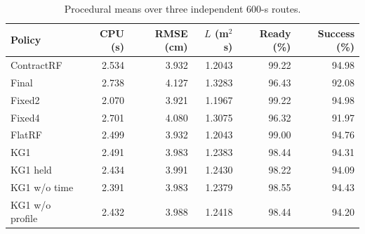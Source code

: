 \begin{table}[!htbp]\centering\footnotesize
\caption{Procedural means over three independent 600-s routes.}\label{supp:routeProceduralAirframe}
\begin{tabular}{@{}lrrrrr@{}}\toprule
Policy & CPU (s) & RMSE (cm) & $L$ (m$^2$s) & Ready (\%) & Success (\%)\\\midrule
ContractRF & 2.534 & 3.932 & 1.2043 & 99.22 & 94.98\\
Final & 2.738 & 4.127 & 1.3283 & 96.43 & 92.08\\
Fixed2 & 2.070 & 3.921 & 1.1967 & 99.22 & 94.98\\
Fixed4 & 2.701 & 4.080 & 1.3075 & 96.32 & 91.97\\
FlatRF & 2.499 & 3.932 & 1.2043 & 99.00 & 94.76\\
KG1 & 2.491 & 3.983 & 1.2383 & 98.44 & 94.31\\
KG1 held & 2.434 & 3.991 & 1.2430 & 98.22 & 94.09\\
KG1 w/o time & 2.391 & 3.983 & 1.2379 & 98.55 & 94.43\\
KG1 w/o profile & 2.432 & 3.988 & 1.2418 & 98.44 & 94.20\\
\bottomrule\end{tabular}\end{table}

